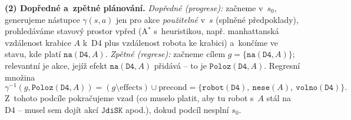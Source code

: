 \begin{priklad}
\medskip
\textbf{(2) Dopředné a~zpětné plánování.} \emph{Dopředné (progrese):} začneme v~$s_0$, generujeme nástupce $\gamma(s,a)$ jen pro akce \emph{použitelné} v~$s$ (splněné předpoklady), prohledáváme stavový prostor vpřed (A${}^\ast$ s~heuristikou, např. manhattanská vzdálenost krabice $A$ k~D4 plus vzdálenost robota ke krabici) a~končíme ve stavu, kde platí $\mathtt{na}(\mathtt{D4},A)$. \emph{Zpětné (regrese):} začneme cílem $g=\{\mathtt{na}(\mathtt{D4},A)\}$; relevantní je akce, jejíž efekt $\mathtt{na}(\mathtt{D4},A)$ přidává -- to je $\mathtt{Poloz}(\mathtt{D4},A)$. Regresní množina
\[ \gamma^{-1}(g,\mathtt{Poloz}(\mathtt{D4},A))=(g\setminus\mathrm{effects})\cup\mathrm{precond}=\{\mathtt{robot}(\mathtt{D4}),\ \mathtt{nese}(A),\ \mathtt{volno}(\mathtt{D4})\}. \]
Z~tohoto podcíle pokračujeme vzad (co muselo platit, aby tu robot s~$A$ stál na D4 -- musel sem dojít akcí $\mathtt{JdiSK}$ apod.), dokud podcíl nesplní $s_0$.


\end{priklad}

